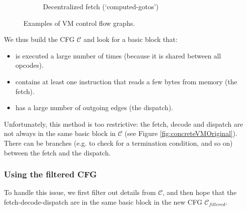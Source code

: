 \documentclass[english]{article}
\begin{document}
\begin{figure}[htp]
\begin{subfigure}{.4\textwidth}
		\caption{Decentralized fetch (`computed-gotos')}
		\label{fig:abstractVM:Decentralized}
	\end{subfigure}
	\caption{Examples of VM control flow graphs.}
	\label{fig:abstractVM}
\end{figure}

We thus build the CFG $\mathcal{C}$ and look for a basic block that:
\begin{itemize}
	\item is executed a large number of times (because it is shared between all opcodes).
	\item contains at least one instruction that reads a few bytes from memory (the fetch).
	\item has a large number of outgoing edges (the dispatch).
\end{itemize} 

Unfortunately, this method is too restrictive: the fetch, decode and dispatch are not always in the same basic block in $\mathcal{C}$ (see Figure \ref{fig:concreteVMOriginal}). There can be branches (e.g. to check for a termination condition, and so on) between the fetch and the dispatch. 

\subsubsection{Using the filtered CFG}

To handle this issue, we first filter out details from $\mathcal{C}$, and then hope that the fetch-decode-dispatch are in the same basic block in the new CFG $\mathcal{C}_{filtered}$. 
\end{document}
